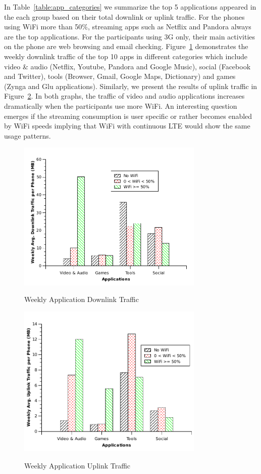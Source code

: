 In Table~\ref{table:app_categories} we summarize the top 5 applications appeared in the each group based on their total downlink or uplink traffic. For the phones using WiFi more than 50\%, streaming apps such as Netflix and Pandora always are the top applications. For the participants using 3G only, their main activities on the phone are web browsing and email checking. Figure~\ref{fig:app_downlink} demonstrates the weekly downlink traffic of the top 10 apps in different categories which include video \& audio (Netflix, Youtube, Pandora and Google Music), social (Facebook and Twitter), tools (Browser, Gmail, Google Maps, Dictionary) and games (Zynga and Glu applications). Similarly, we present the results of uplink traffic in Figure~\ref{fig:app_uplink}. In both graphs, the traffic of video and audio applications increases dramatically when the participants use more WiFi. An interesting
question emerges if the streaming consumption is user specific or rather becomes enabled by WiFi speeds
implying that WiFi with continuous LTE would show the same usage patterns. 

\begin{figure}[h!tbp]
\centering
{\includegraphics[width = 3.5in]{graphs/app_downlink.pdf}}
\caption{Weekly Application Downlink Traffic} 
\label{fig:app_downlink}
\end{figure}

\begin{figure}[h!tbp]
\centering
{\includegraphics[width = 3.5in]{graphs/app_uplink.pdf}}
\caption{Weekly Application Uplink Traffic} 
\label{fig:app_uplink}
\end{figure}

